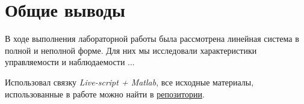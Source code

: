 \chapter{Общие выводы}
\label{ch:chap6}

В ходе выполнения лабораторной работы была рассмотрена линейная система в полной и неполной форме. Для них мы исследовали характеристики управляемости и наблюдаемости ...

Использовал связку \textit{Live-script + Matlab}, все исходные материалы, использованные в работе можно найти  в \href{https://github.com/GreedlyCore/control_theory_course}{репозитории}. 
\endinput